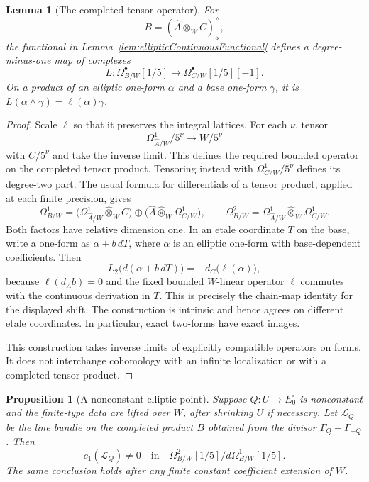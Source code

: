 \documentclass[11pt,a4paper]{article}
\newtheorem{lemma}[theorem]{Lemma}
\newtheorem{proposition}[theorem]{Proposition}
\theoremstyle{remark}
\begin{document}
\begin{lemma}[The completed tensor operator]
\label{lem:ellipticCompletedTensor}
For
\[
 B=(\widehat A\otimes_W C)^{\wedge}_5,
\]
the functional in Lemma~\ref{lem:ellipticContinuousFunctional} defines
a degree-minus-one map of complexes
\[
 L:\Omega^\bullet_{B/W}[1/5]
       \longrightarrow \Omega^\bullet_{C/W}[1/5][-1].
\]
On a product of an elliptic one-form $\alpha$ and a base one-form
$\gamma$, it is $L(\alpha\wedge\gamma)=\ell(\alpha)\gamma$.
\end{lemma}

\begin{proof}
Scale $\ell$ so that it preserves the integral lattices.  For each
$\nu$, tensor
\[
 \Omega^1_{\widehat A/W}/5^\nu\longrightarrow W/5^\nu
\]
with $C/5^\nu$ and take the inverse limit.  This defines the required
bounded operator on the completed tensor product.  Tensoring instead
with $\Omega^1_{C/W}/5^\nu$ defines its degree-two part.  The usual
formula for differentials of a tensor product, applied at each finite
precision, gives
\[
 \Omega^1_{B/W}
  =\bigl(\Omega^1_{\widehat A/W}\widehat\otimes_W C\bigr)
    \oplus\bigl(\widehat A\widehat\otimes_W\Omega^1_{C/W}\bigr),
 \qquad
 \Omega^2_{B/W}
  =\Omega^1_{\widehat A/W}\widehat\otimes_W\Omega^1_{C/W}.
\]
Both factors have relative dimension one.  In an etale coordinate
$T$ on the base, write a one-form as $\alpha+b\,dT$, where $\alpha$
is an elliptic one-form with base-dependent coefficients.  Then
\[
 L_2\bigl(d(\alpha+b\,dT)\bigr)
   =-d_C\bigl(\ell(\alpha)\bigr),
\]
because $\ell(d_A b)=0$ and the fixed bounded $W$-linear operator
$\ell$ commutes with the continuous derivation in $T$.  This is
precisely the chain-map identity for the displayed shift.  The
construction is intrinsic and hence agrees on different etale
coordinates.  In particular, exact two-forms have exact images.

This construction takes inverse limits of explicitly compatible
operators on forms.  It does not interchange cohomology with an
infinite localization or with a completed tensor product.
\end{proof}

\begin{proposition}[A nonconstant elliptic point]
\label{prop:ellipticCohenDetector}
Suppose $Q:U\to E_0^\circ$ is nonconstant and the finite-type data
are lifted over $W$, after shrinking $U$ if necessary.  Let
$\mathcal L_Q$ be the line bundle on the completed product $B$
obtained from the divisor $\Gamma_Q-\Gamma_{-Q}$.  Then
\[
 c_1(\mathcal L_Q)\ne0
 \quad\text{in}\quad
 \Omega^2_{B/W}[1/5]\big/d\Omega^1_{B/W}[1/5].
\]
The same conclusion holds after any finite constant coefficient
extension of $W$.
\end{proposition}
\end{document}
